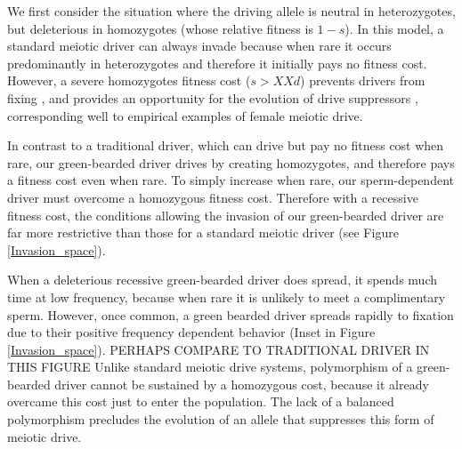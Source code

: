 \documentclass[12pt,letterpaper]{article}
\newcommand{\yb}[1]{{ \color{blue} #1}}
\begin{document}
\yb{We first consider the situation where the driving allele is neutral in heterozygotes, 
	but deleterious in homozygotes (whose relative fitness is $1-s$). } 
\yb{In this model, a standard meiotic driver can always invade because 
	when rare it occurs predominantly in heterozygotes and therefore it initially pays no fitness cost.} 
\yb{However, a severe homozygotes fitness cost ($s>XXd$) prevents  
	drivers from fixing  \citep{Prout1973}, 
	and provides an opportunity for the
	evolution of drive suppressors  \citep{XX}, corresponding well to 
	empirical examples of female meiotic drive. }



\yb{In contrast to a traditional driver, which can drive but pay no fitness cost when rare, 
	our green-bearded driver drives by creating homozygotes, and therefore pays a fitness cost even when rare. 
To simply increase when rare, our sperm-dependent driver must overcome a homozygous fitness cost.
Therefore with a recessive fitness cost,
	the conditions allowing the invasion of our green-bearded driver 
 	are far more restrictive than those for a standard meiotic driver (see Figure \ref{Invasion_space}).}


\yb{When a deleterious recessive green-bearded driver does spread, 
	it spends much time at low frequency, because when rare it is unlikely to meet a complimentary sperm. 
However, once common, a green bearded driver spreads rapidly to fixation due to their
	positive frequency dependent behavior (Inset in Figure \ref{Invasion_space}).  PERHAPS COMPARE TO TRADITIONAL DRIVER IN THIS FIGURE
Unlike standard meiotic drive systems, polymorphism of a green-bearded driver cannot be sustained by a homozygous cost, 
	because it already overcame this cost just to enter the population.
The lack of a balanced polymorphism precludes the evolution of an allele that suppresses this form of meiotic drive.}
\end{document}
